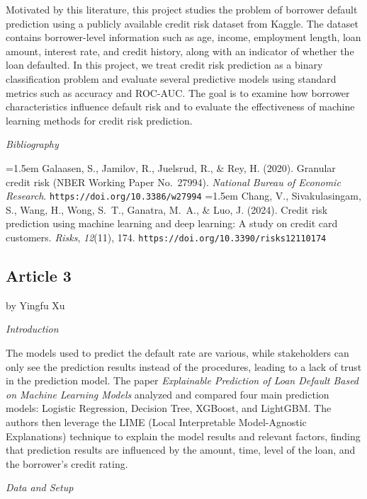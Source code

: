 \documentclass[letterpaper]{article}
\begin{document}
	Motivated by this literature, this project studies the problem of borrower default prediction using a publicly available credit risk dataset from Kaggle. The dataset contains borrower-level information such as age, income, employment length, loan amount, interest rate, and credit history, along with an indicator of whether the loan defaulted. In this project, we treat credit risk prediction as a binary classification problem and evaluate several predictive models using standard metrics such as accuracy and ROC-AUC. The goal is to examine how borrower characteristics influence default risk and to evaluate the effectiveness of machine learning methods for credit risk prediction.
	
	\bigskip
	
	\textit{Bibliography}
	
	\hangindent=1.5em
	Galaasen, S., Jamilov, R., Juelsrud, R., \& Rey, H. (2020). Granular credit risk (NBER Working Paper No.\ 27994). \textit{National Bureau of Economic Research}. \texttt{https://doi.org/10.3386/w27994}
	\hangindent=1.5em
	Chang, V., Sivakulasingam, S., Wang, H., Wong, S.~T., Ganatra, M.~A., \& Luo, J. (2024). Credit risk prediction using machine learning and deep learning: A study on credit card customers. \textit{Risks}, \textit{12}(11), 174. \texttt{https://doi.org/10.3390/risks12110174}
	
	\subsection{Article 3}
	
	{\color{deepred} by Yingfu Xu}
	

	\textit{Introduction}
	
	The models used to predict the default rate are various, while stakeholders can only see the prediction results instead of the procedures, leading to a lack of trust in the prediction model. The paper \textit{Explainable Prediction of Loan Default Based on Machine Learning Models} analyzed and compared four main prediction models: Logistic Regression, Decision Tree, XGBoost, and LightGBM. The authors then leverage the LIME (Local Interpretable Model-Agnostic Explanations) technique to explain the model results and relevant factors, finding that prediction results are influenced by the amount, time, level of the loan, and the borrower's credit rating.
	
	\medskip
	
	\textit{Data and Setup}
	
\end{document}
